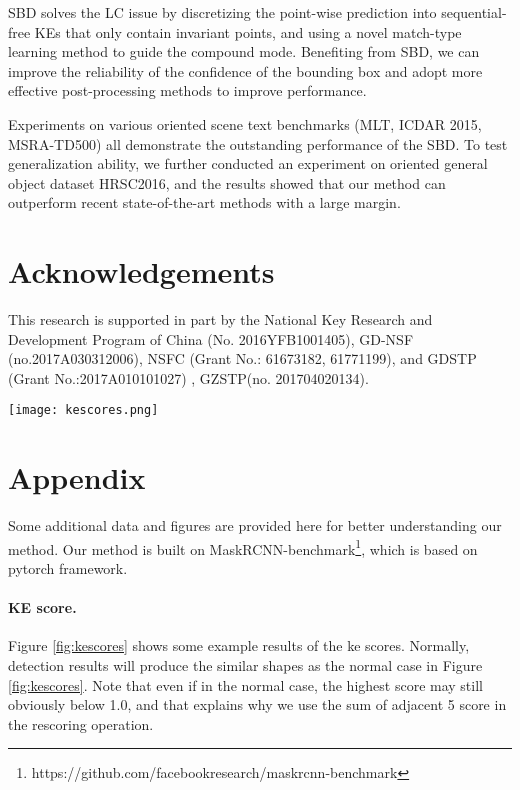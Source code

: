 \documentclass{article}
\begin{document}
SBD solves the LC issue by discretizing the point-wise prediction into sequential-free KEs that only contain invariant points, and using a novel match-type learning method to guide the compound mode. Benefiting from SBD, we can improve the reliability of the confidence of the bounding box and adopt more effective post-processing methods to improve performance.

Experiments on various oriented scene text benchmarks (MLT, ICDAR 2015, MSRA-TD500) all demonstrate the outstanding performance of the SBD. To test generalization ability, we further conducted an experiment on oriented general object dataset HRSC2016, and the results showed that our method can outperform recent state-of-the-art methods with a large margin.

\section*{Acknowledgements}
This research is supported in part by the National Key Research and Development Program  of China (No. 2016YFB1001405), GD-NSF (no.2017A030312006),  NSFC (Grant No.: 61673182, 61771199), and GDSTP (Grant No.:2017A010101027) , GZSTP(no. 201704020134).




\begin{figure*}[!t]
  \centering
  \centerline{\texttt{[image: kescores.png]}}
  \caption{Examples of KE score results.}\label{fig:kescores}
\end{figure*}
\newpage
\section*{Appendix}

Some additional data and figures are provided here for better understanding our method. Our method is built on MaskRCNN-benchmark\footnote{https://github.com/facebookresearch/maskrcnn-benchmark}, which is based on pytorch framework.

\paragraph{KE score.} Figure \ref{fig:kescores} shows some example results of the ke scores. Normally, detection results will produce the similar shapes as the normal case in Figure \ref{fig:kescores}. Note that even if in the normal case, the highest score may still obviously below 1.0, and that explains why we use the sum of adjacent 5 score in the rescoring operation.
\end{document}
